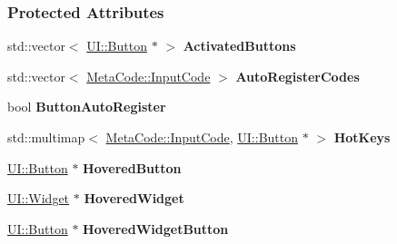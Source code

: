 \subsubsection*{Protected Attributes}
\begin{DoxyCompactItemize}
\item 
\hypertarget{classMezzanine_1_1UIManager_afc8f4929c4ebd442c56abd1ee80ca841}{
std::vector$<$ \hyperlink{classMezzanine_1_1UI_1_1Button}{UI::Button} $\ast$ $>$ {\bfseries ActivatedButtons}}
\label{classMezzanine_1_1UIManager_afc8f4929c4ebd442c56abd1ee80ca841}

\item 
\hypertarget{classMezzanine_1_1UIManager_a362c2799989a67d06a461dfbd2bab84a}{
std::vector$<$ \hyperlink{classMezzanine_1_1MetaCode_a3b5633f0145bf3287cf53a3f05b5563c}{MetaCode::InputCode} $>$ {\bfseries AutoRegisterCodes}}
\label{classMezzanine_1_1UIManager_a362c2799989a67d06a461dfbd2bab84a}

\item 
\hypertarget{classMezzanine_1_1UIManager_acc3062c3692ab87358783f647dd23b94}{
bool {\bfseries ButtonAutoRegister}}
\label{classMezzanine_1_1UIManager_acc3062c3692ab87358783f647dd23b94}

\item 
\hypertarget{classMezzanine_1_1UIManager_a5c47b882402fe1db04b1aa988cc2ce1d}{
std::multimap$<$ \hyperlink{classMezzanine_1_1MetaCode_a3b5633f0145bf3287cf53a3f05b5563c}{MetaCode::InputCode}, \hyperlink{classMezzanine_1_1UI_1_1Button}{UI::Button} $\ast$ $>$ {\bfseries HotKeys}}
\label{classMezzanine_1_1UIManager_a5c47b882402fe1db04b1aa988cc2ce1d}

\item 
\hypertarget{classMezzanine_1_1UIManager_add654b26cd0824c9020794bea7dfd1f5}{
\hyperlink{classMezzanine_1_1UI_1_1Button}{UI::Button} $\ast$ {\bfseries HoveredButton}}
\label{classMezzanine_1_1UIManager_add654b26cd0824c9020794bea7dfd1f5}

\item 
\hypertarget{classMezzanine_1_1UIManager_a60b60d5e81b1941a70d35e19f4a138e3}{
\hyperlink{classMezzanine_1_1UI_1_1Widget}{UI::Widget} $\ast$ {\bfseries HoveredWidget}}
\label{classMezzanine_1_1UIManager_a60b60d5e81b1941a70d35e19f4a138e3}

\item 
\hypertarget{classMezzanine_1_1UIManager_af19c7135edced806c6c1a9fce5254597}{
\hyperlink{classMezzanine_1_1UI_1_1Button}{UI::Button} $\ast$ {\bfseries HoveredWidgetButton}}
\label{classMezzanine_1_1UIManager_af19c7135edced806c6c1a9fce5254597}


\end{DoxyCompactItemize}

